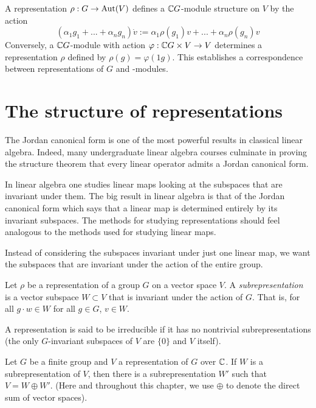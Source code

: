A representation $\rho : G \rightarrow \operatorname{Aut}(V)$ defines a $\mathbb{C} G$-module structure on $V$ by the action
\[
    (\alpha_1g_1 + ... + \alpha_ng_n) \dot v := \alpha_1\rho(g_1)v + ...+ \alpha_n\rho(g_n)v
\]
Conversely, a $\mathbb{C} G$-module with action $\varphi : \mathbb{C} G \times V \rightarrow V$ determines a representation $\rho$ 
defined by $\rho(g) = \varphi(1g)$. This establishes a correspondence between representations of $G$ and 
\CG-modules.


\section{The structure of representations}


The Jordan canonical form is one of the most powerful results in classical linear algebra. Indeed, many 
undergraduate linear algebra courses culminate in proving the structure theorem that every linear operator admits a 
Jordan canonical form. 


In linear algebra one studies linear maps looking at the subspaces that are invariant under them. The big result in 
linear algebra is that of the Jordan canonical form which says that a linear map is determined entirely by its 
invariant subspaces. The methods for studying representations should feel analogous to the methods used for 
studying linear maps. 

Instead of considering the subspaces invariant under just one linear map, we want the subspaces that are invariant 
under the action of the entire group. 

\begin{definition}
    Let $\rho$ be a representation of a group $G$ on a vector space $V$. A \emph{subrepresentation} is a vector 
    subspace $W \subset V$ that is invariant under the action of $G$. That is, for all $g\cdot w \in W$ for all $g 
    \in G$, $v \in W$.
 

    A representation is said to be irreducible if it has no nontrivial subrepresentations (the only $G$-invariant 
    subspaces of $V$ are $\{ 0 \}$ and $V$ itself).
\end{definition}

\begin{theorem}
    Let $G$ be a finite group and $V$ a representation of $G$ over $\mathbb{C}$. If $W$ is a subrepresentation of $V$, then 
there is a subrepresentation $W'$ such that $V = W \oplus W'$. (Here and throughout this chapter, we use $\oplus$ 
to denote the direct sum of vector spaces).
\end{theorem}


